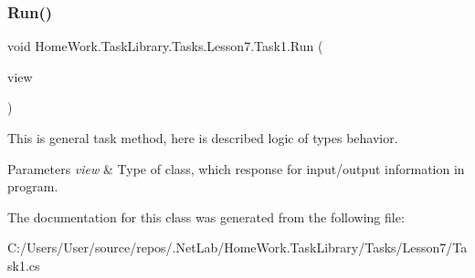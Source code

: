 \subsubsection{\texorpdfstring{Run()}{Run()}}
{\footnotesize\ttfamily void Home\+Work.\+Task\+Library.\+Tasks.\+Lesson7.\+Task1.\+Run (\begin{DoxyParamCaption}\item[{I\+Information}]{view }\end{DoxyParamCaption})}



This is general task method, here is described logic of types behavior. 


\begin{DoxyParams}{Parameters}
{\em view} & Type of class, which response for input/output information in program.\\
\hline
\end{DoxyParams}


The documentation for this class was generated from the following file\+:\begin{DoxyCompactItemize}
\item 
C\+:/\+Users/\+User/source/repos/.\+Net\+Lab/\+Home\+Work.\+Task\+Library/\+Tasks/\+Lesson7/Task1.\+cs\end{DoxyCompactItemize}
